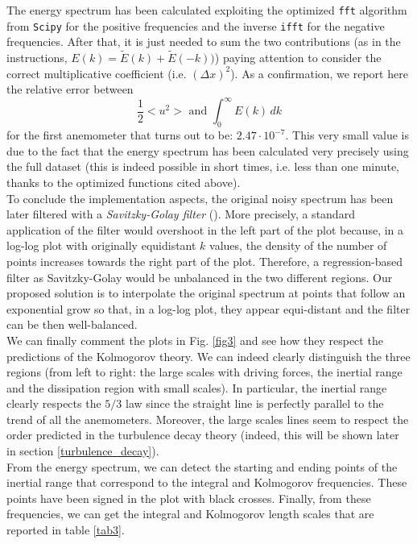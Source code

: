 \documentclass[11pt,titlepage]{article}
\begin{document}
The energy spectrum has been calculated exploiting the optimized \texttt{fft} algorithm from \texttt{Scipy} for the positive frequencies and the inverse \texttt{ifft} for the negative frequencies. After that, it is just needed to sum the two contributions (as in the instructions, $E(k) = \tilde{E}(k) + \tilde{E}(-k) )$) paying attention to consider the correct multiplicative coefficient (i.e. $(\Delta x)^2$). As a confirmation, we report here the relative error between
\begin{equation*}
	\frac{1}{2}<u^2> \text{ and } \int_0^\infty E(k)\, dk
\end{equation*}
for the first anemometer that turns out to be: $2.47 \cdot 10^{-7}$. This very small value is due to the fact that the energy spectrum has been calculated very precisely using the full dataset (this is indeed possible in short times, i.e. less than one minute, thanks to the optimized functions cited above). \\
To conclude the implementation aspects, the original noisy spectrum has been later filtered with a \emph{Savitzky-Golay filter} (\cite{savgol}). More precisely, a standard application of the filter would overshoot in the left part of the plot because, in a log-log plot with originally equidistant $k$ values, the density of the number of points increases towards the right part of the plot. Therefore, a regression-based filter as Savitzky-Golay would be unbalanced in the two different regions. Our proposed solution is to interpolate the original spectrum at points that follow an exponential grow so that, in a log-log plot, they appear equi-distant and the filter can be then well-balanced. \\

We can finally comment the plots in Fig. \ref{fig3} and see how they respect the predictions of the Kolmogorov theory. We can indeed clearly distinguish the three regions (from left to right: the large scales with driving forces, the inertial range and the dissipation region with small scales). In particular, the inertial range clearly respects the $5/3$ law since the straight line is perfectly parallel to the trend of all the anemometers. Moreover, the large scales lines seem to respect the order predicted in the turbulence decay theory (indeed, this will be shown later in section \ref{turbulence_decay}). \\

From the energy spectrum, we can detect the starting and ending points of the inertial range that correspond to the integral and Kolmogorov frequencies. These points have been signed in the plot with black crosses. Finally, from these frequencies, we can get the integral and Kolmogorov length scales that are reported in table \ref{tab3}. \\
\end{document}
